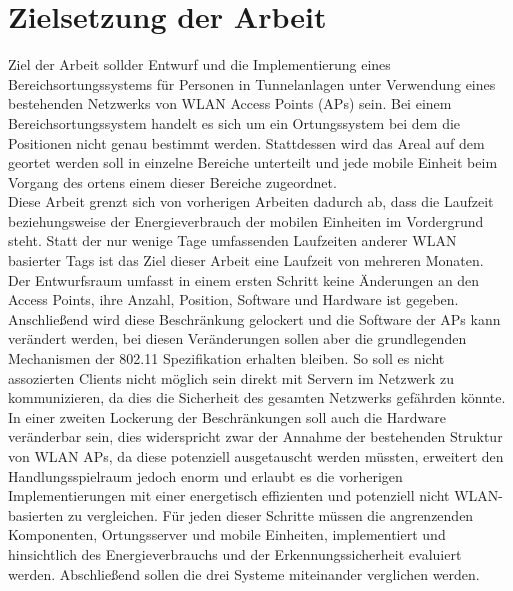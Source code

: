 \section{Zielsetzung der Arbeit}
\label{ch:Einleitung:sec:Zielsetzung}
Ziel der Arbeit sollder Entwurf und die Implementierung eines Bereichsortungssystems für Personen in Tunnelanlagen unter Verwendung eines bestehenden Netzwerks von WLAN Access Points (APs) sein. 
Bei einem Bereichsortungssystem handelt es sich um ein Ortungssystem bei dem die Positionen nicht genau bestimmt werden. 
Stattdessen wird das Areal auf dem geortet werden soll in einzelne Bereiche unterteilt und jede mobile Einheit beim Vorgang des ortens einem dieser Bereiche zugeordnet.\\
Diese Arbeit grenzt sich von vorherigen Arbeiten dadurch ab, dass die Laufzeit beziehungsweise der Energieverbrauch der mobilen Einheiten im Vordergrund steht. 
Statt der nur wenige Tage umfassenden Laufzeiten anderer WLAN basierter Tags ist das Ziel dieser Arbeit eine Laufzeit von mehreren Monaten. \\
Der Entwurfsraum umfasst in einem ersten Schritt keine Änderungen an den Access Points, ihre Anzahl, Position, Software und Hardware ist gegeben. 
Anschließend wird diese Beschränkung gelockert und die Software der APs kann verändert werden, bei diesen Veränderungen sollen aber die grundlegenden Mechanismen der 802.11 Spezifikation erhalten bleiben. 
So soll es nicht assozierten Clients nicht möglich sein direkt mit Servern im Netzwerk zu kommunizieren, da dies die Sicherheit des gesamten Netzwerks gefährden könnte.
In einer zweiten Lockerung der Beschränkungen soll auch die Hardware veränderbar sein, dies widerspricht zwar der Annahme der bestehenden Struktur von WLAN APs, da diese potenziell ausgetauscht werden müssten, erweitert den Handlungsspielraum jedoch enorm und erlaubt es die vorherigen Implementierungen mit einer energetisch effizienten und potenziell nicht WLAN-basierten zu vergleichen. 
Für jeden dieser Schritte müssen die angrenzenden Komponenten, Ortungsserver und mobile Einheiten, implementiert und hinsichtlich des Energieverbrauchs und der Erkennungssicherheit evaluiert werden. Abschließend sollen die drei Systeme miteinander verglichen werden. \\


